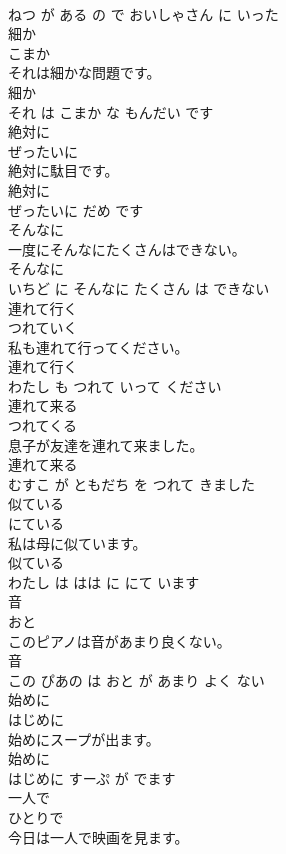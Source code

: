 \documentclass[8pt]{extreport}
\begin{document}
\begin{CJK}{UTF8}{min}
\\	ねつ が ある の で おいしゃさん に いった			
\\	細か	
\\	こまか			
\\	それは細かな問題です。	
\\	細か 
\\	それ は こまか な もんだい です			
\\	絶対に	
\\	ぜったいに			
\\	絶対に駄目です。	
\\	絶対に 
\\	ぜったいに だめ です			
\\	そんなに	
\\	一度にそんなにたくさんはできない。	
\\	そんなに 
\\	いちど に そんなに たくさん は できない			
\\	連れて行く	
\\	つれていく			
\\	私も連れて行ってください。	
\\	連れて行く 
\\	わたし も つれて いって ください			
\\	連れて来る	
\\	つれてくる			
\\	息子が友達を連れて来ました。	
\\	連れて来る 
\\	むすこ が ともだち を つれて きました			
\\	似ている	
\\	にている			
\\	私は母に似ています。	
\\	似ている 
\\	わたし は はは に にて います			
\\	音	
\\	おと			
\\	このピアノは音があまり良くない。	
\\	音 
\\	この ぴあの は おと が あまり よく ない			
\\	始めに	
\\	はじめに			
\\	始めにスープが出ます。	
\\	始めに 
\\	はじめに すーぷ が でます			
\\	一人で	
\\	ひとりで			
\\	今日は一人で映画を見ます。	

\end{CJK}
\end{document}
